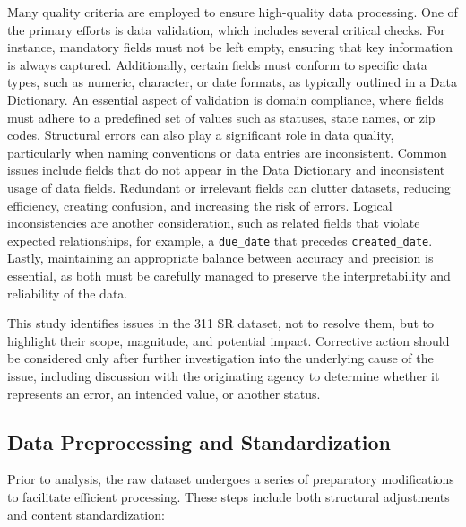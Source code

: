 \documentclass[linenumber]{jdsart}
\begin{document}
Many quality criteria are employed to ensure high-quality data 
processing. One of the primary efforts is data validation, which includes 
several critical checks. For instance, mandatory fields must not be 
left empty, ensuring that key information is always captured. 
Additionally, certain fields must conform to specific data types,
such as numeric, character, or date formats,
as typically outlined in a Data Dictionary. An essential aspect of 
validation is domain compliance, where fields must adhere to a predefined set of 
values such as statuses, state names, or zip codes. Structural 
errors can also play a significant role in data quality, particularly when 
naming conventions or data entries are inconsistent. Common issues 
include fields that do not appear in the Data Dictionary and  
inconsistent usage of data fields. Redundant or irrelevant fields can 
clutter datasets, reducing efficiency, creating confusion, and 
increasing the risk of errors. Logical inconsistencies 
are another consideration, such as related fields that violate expected 
relationships, for example, a \texttt{due\_date} that 
precedes \texttt{created\_date}. Lastly, maintaining an 
appropriate balance between accuracy and precision 
is essential, as both must be carefully managed to preserve 
the interpretability and reliability of the data.


This study identifies issues in the 311 SR dataset,
not to resolve them, but to highlight their scope, magnitude, 
and potential impact. Corrective action should be considered only after further
investigation into the underlying cause of the issue,
including discussion with the originating agency to determine
whether it represents an error, an intended value, or
another status.



\subsection{Data Preprocessing and Standardization}
\label{subsec:premodifications}
Prior to analysis, the raw dataset undergoes a series of
preparatory modifications to facilitate efficient processing.
These steps include both structural adjustments and content standardization:
\end{document}
